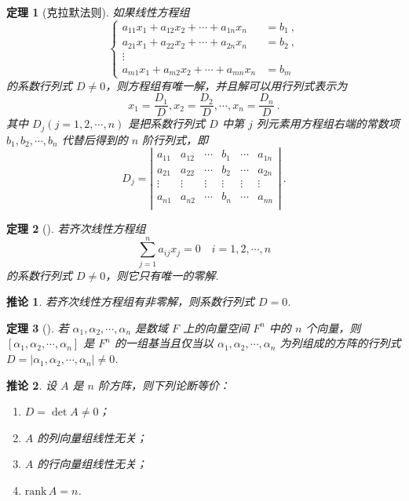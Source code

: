 \documentclass[zihao=-4,UTF8,linespread=1.8,nothm]{aytony_base}
\newtheorem{theorem}{\indent 定理}[subsection]
\newtheorem*{corollary}{\indent 推论}
\begin{document}
\begin{theorem}[克拉默法则]
    如果线性方程组 $$
        \left\{
        \begin{aligned}
            a_{11}x_1 + a_{12}x_2 + \cdots + a_{1n}x_n & = b_1\ , \\
            a_{21}x_1 + a_{22}x_2 + \cdots + a_{2n}x_n & = b_2\ , \\
            \vdots                                                \\
            a_{m1}x_1 + a_{m2}x_2 + \cdots + a_{mn}x_n & = b_m
        \end{aligned}
        \right.
    $$ 的系数行列式 $D \neq 0$，则方程组有唯一解，并且解可以用行列式表示为 $$
        x_1 = \dfrac{D_1}{D}, x_2 = \dfrac{D_2}{D}, \cdots, x_n = \dfrac{D_n}{D}\ .
    $$ 其中 $D_{j}(j = 1, 2, \cdots, n)$ 是把系数行列式 $D$ 中第 $j$ 列元素用方程组右端的常数项 $b_1, b_2, \cdots, b_n$ 代替后得到的 $n$ 阶行列式，即 $$
        D_j = \left|
        \begin{matrix}
            a_{11} & a_{12} & \cdots & b_{1}  & \cdots & a_{1n} \\
            a_{21} & a_{22} & \cdots & b_{2}  & \cdots & a_{2n} \\
            \vdots & \vdots & \vdots & \vdots & \vdots & \vdots \\
            a_{n1} & a_{n2} & \cdots & b_{n}  & \cdots & a_{nn} \\
        \end{matrix}
        \right|\ .
    $$
\end{theorem}

\begin{theorem}[]
    若齐次线性方程组 $$
        \sum\limits_{j=1}^{n}a_{ij}x_j = 0\quad i = 1, 2, \cdots, n
    $$ 的系数行列式 $D \neq 0$，则它只有唯一的零解.
\end{theorem}

\begin{corollary}
    若齐次线性方程组有非零解，则系数行列式 $D = 0$.
\end{corollary}

\begin{theorem}[]
    若 $\alpha_1, \alpha_2, \cdots, \alpha_n$ 是数域 $F$ 上的向量空间 $F^n$ 中的 $n$ 个向量，则 $[\alpha_1, \alpha_2, \cdots, \alpha_n]$ 是 $F^n$ 的一组基当且仅当以 $\alpha_1, \alpha_2, \cdots, \alpha_n$ 为列组成的方阵的行列式 $D = |\alpha_1, \alpha_2, \cdots, \alpha_n| \neq 0$.
\end{theorem}

\begin{corollary}
    设 $A$ 是 $n$ 阶方阵，则下列论断等价：
    \begin{enumerate}[nosep]
        \item $D = \det A \neq 0$；
        \item $A$ 的列向量组线性无关；
        \item $A$ 的行向量组线性无关；
        \item $\mathrm{rank}\,A = n$.
    \end{enumerate}
\end{corollary}
\end{document}
